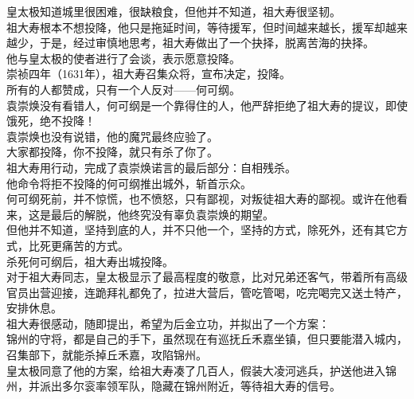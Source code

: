 \begin{multicols}{\theparacolNo}
皇太极知道城里很困难，很缺粮食，但他并不知道，祖大寿很坚韧。\\

祖大寿根本不想投降，他只是拖延时间，等待援军，但时间越来越长，援军却越来越少，于是，经过审慎地思考，祖大寿做出了一个抉择，脱离苦海的抉择。\\

他与皇太极的使者进行了会谈，表示愿意投降。\\

崇祯四年（1631年），祖大寿召集众将，宣布决定，投降。\\

所有的人都赞成，只有一个人反对——何可纲。\\

袁崇焕没有看错人，何可纲是一个靠得住的人，他严辞拒绝了祖大寿的提议，即使饿死，绝不投降！\\

袁崇焕也没有说错，他的魔咒最终应验了。\\

大家都投降，你不投降，就只有杀了你了。\\

祖大寿用行动，完成了袁崇焕诺言的最后部分：自相残杀。\\

他命令将拒不投降的何可纲推出城外，斩首示众。\\

何可纲死前，并不惊慌，也不愤怒，只有鄙视，对叛徒祖大寿的鄙视。或许在他看来，这是最后的解脱，他终究没有辜负袁崇焕的期望。\\

但他并不知道，坚持到底的人，并不只他一个，坚持的方式，除死外，还有其它方式，比死更痛苦的方式。\\

杀死何可纲后，祖大寿出城投降。\\

对于祖大寿同志，皇太极显示了最高程度的敬意，比对兄弟还客气，带着所有高级官员出营迎接，连跪拜礼都免了，拉进大营后，管吃管喝，吃完喝完又送土特产，安排休息。\\

祖大寿很感动，随即提出，希望为后金立功，并拟出了一个方案：\\

锦州的守将，都是自己的手下，虽然现在有巡抚丘禾嘉坐镇，但只要能潜入城内，召集部下，就能杀掉丘禾嘉，攻陷锦州。\\

皇太极同意了他的方案，给祖大寿凑了几百人，假装大凌河逃兵，护送他进入锦州，并派出多尔衮率领军队，隐藏在锦州附近，等待祖大寿的信号。\\


\end{multicols}
